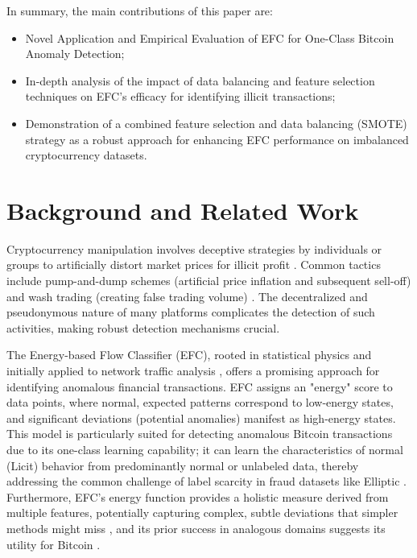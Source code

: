 \documentclass[12pt]{article}
\begin{document}
In summary, the main contributions of this paper are:

\begin{itemize}
    \item Novel Application and Empirical Evaluation of EFC for One-Class Bitcoin Anomaly Detection;
    \item In-depth analysis of the impact of data balancing and feature selection techniques on EFC's efficacy for
    identifying illicit transactions;
    \item Demonstration of a combined feature selection and data balancing (SMOTE) strategy as a robust approach for enhancing
    EFC performance on imbalanced cryptocurrency datasets.
\end{itemize}

\section{Background and Related Work} \label{sec:background}
Cryptocurrency manipulation involves deceptive strategies by individuals or groups to artificially distort market prices
for illicit profit \cite{cryptocurrency_arket_manipulation_2021}. Common tactics include pump-and-dump schemes (artificial
price inflation and subsequent sell-off) and wash trading (creating false trading volume) \cite{karim2018manipulation,
gandal2018price, edelman2018detecting}. The decentralized and pseudonymous nature of many platforms complicates the detection
of such activities, making robust detection mechanisms crucial.

The Energy-based Flow Classifier (EFC), rooted in statistical physics and initially applied to network traffic analysis
\cite{pontes2019}, offers a promising approach for identifying anomalous financial transactions. EFC assigns an "energy"
score to data points, where normal, expected patterns correspond to low-energy states, and significant deviations (potential
anomalies) manifest as high-energy states. This model is particularly suited for detecting anomalous Bitcoin transactions
due to its one-class learning capability; it can learn the characteristics of normal (Licit) behavior from predominantly
normal or unlabeled data, thereby addressing the common challenge of label scarcity in fraud datasets like Elliptic
\cite{bansal2022systematic}. Furthermore, EFC's energy function provides a holistic measure derived from multiple features,
potentially capturing complex, subtle deviations that simpler methods might miss \cite{wilson2024future}, and its prior
success in analogous domains suggests its utility for Bitcoin \cite{pontes2019, souza2022novelopensetenergybased}.
\end{document}

